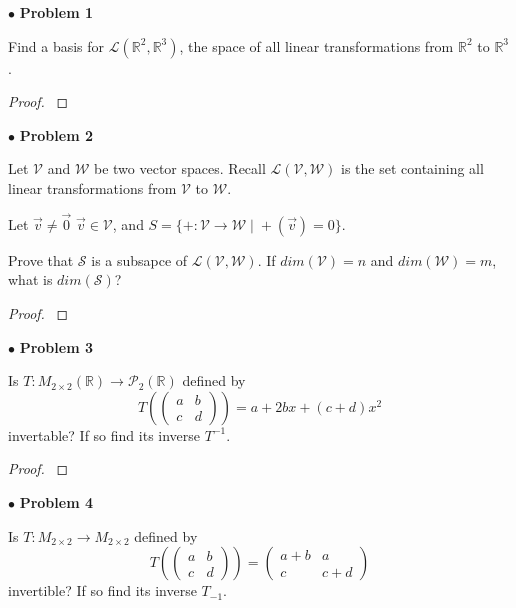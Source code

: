\documentclass{article}
\begin{document}
$ \bullet$ \textbf{Problem 1}
\medskip

\begin{itshape}
Find a basis for $\mathcal{L}(\mathbb{R}^2, \mathbb{R}^3)$, the space of all linear transformations from $\mathbb{R}^2$ to $\mathbb{R}^3$.
\end{itshape}
\medskip

\begin{proof}
$ $\newline
\end{proof}

\newpage
$ \bullet$ \textbf{Problem 2}
\medskip

\begin{itshape}
Let $\mathcal{V}$ and $\mathcal{W}$ be two vector spaces. Recall $\mathcal{L}(\mathcal{V}, \mathcal{W})$ is the set containing all linear transformations from $\mathcal{V}$ to $\mathcal{W}$. 

Let $\vec{v} \ne \vec{0}$ $\vec{v} \in \mathcal{V}$, and $S=\{ +: \mathcal{V} \to \mathcal{W} \; | \; +(\vec{v}) = 0 \}$.

Prove that $\mathcal{S}$ is a subsapce of $\mathcal{L}(\mathcal{V}, \mathcal{W})$. If $dim (\mathcal{V}) =n$ and $dim(\mathcal{W})=m$, what is $dim(\mathcal{S})$?
\end{itshape}
\medskip

\begin{proof}
$ $\newline
\end{proof}

\newpage
$ \bullet$ \textbf{Problem 3}
\medskip

\begin{itshape}
Is $T: M_{2 \times 2}(\mathbb{R}) \to \mathcal{P}_2(\mathbb{R})$ defined by $$T( \begin{pmatrix} a & b \\ c & d \end{pmatrix} ) = a+2bx + (c+d)x^2$$ invertable? If so find its inverse $T^{-1}$.
\end{itshape}
\medskip

\begin{proof}
$ $\newline
\end{proof}

\newpage
$ \bullet$ \textbf{Problem 4}
\medskip

\begin{itshape}
Is $T: M_{2 \times 2} \to M_{2 \times 2}$ defined by $$T(\begin{pmatrix} a & b \\ c & d \end{pmatrix}) = \begin{pmatrix} a+b & a \\ c & c+d \end{pmatrix}$$ invertible? If so find its inverse $T_{-1}$.
\end{itshape}
\medskip
\end{document}
